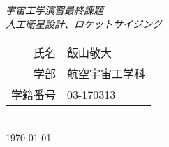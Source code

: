 \documentclass[15pt,uplatex,dvipdfmx]{jsarticle}
\begin{document}
\begin{titlepage}
\begin{center}
\vspace*{30mm}
{\huge\itshape 宇宙工学演習最終課題 \vspace{10mm}\\ 人工衛星設計、ロケットサイジング}
\vspace{30mm} \\
\large
\begin{tabular}{rl}
氏名 & 飯山敬大\\
学部 & 航空宇宙工学科\\
学籍番号 & 03-170313
\end{tabular} \vspace{10mm} \\
\today \vspace{12pt} \\
\end{center}
\end{titlepage}
\end{document}
